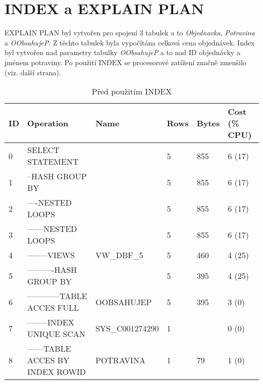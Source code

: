 \documentclass[11pt, a4paper]{article}[]
\begin{document}
    \section{INDEX a EXPLAIN PLAN}
    EXPLAIN PLAN byl vytvořen pro spojení 3 tabulek a to \textit{Objednavka}, \textit{Potravina}
    a \textit{OObsahujeP}. Z těchto tabulek byla vypočítána celková cena objednávek.
    Index byl vytvořen nad parametry tabulky \textit{OObsahujeP} a to nad ID objednávky
    a jménem potraviny. Po použití INDEX se procesorové zatížení značně zmenšilo
    (viz. další strana).
\pagebreak
    \begin{table}[h]
	\caption{Před použitím INDEX}
	\centering
	\begin{tabular}{|l|l|l|l|l|l|}
        \hline
        ID & Operation                        & Name            & Rows & Bytes & Cost (\% CPU) \\ \hline
        0  & SELECT STATEMENT                 &                 & 5    & 855   & 6 (17)        \\
        1  & --HASH GROUP BY                  &                 & 5    & 855   & 6 (17)        \\
        2  & ----NESTED LOOPS                 &                 & 5    & 855   & 6 (17)        \\
        3  & ------NESTED LOOPS               &                 & 5    & 855   & 6 (17)        \\
        4  & --------VIEWS                    & VW\_DBF\_5      & 5    & 460   & 4 (25)        \\
        5  & ----------HASH GROUP BY          &                 & 5    & 395   & 4 (25)        \\
        6  & ------------TABLE ACCES FULL     & OOBSAHUJEP      & 5    & 395   & 3 (0)         \\
        7  & --------INDEX UNIQUE SCAN        & SYS\_C001274290 & 1    &       & 0 (0)         \\
        8  & ------TABLE ACCES BY INDEX ROWID & POTRAVINA       & 1    & 79    & 1 (0)         \\ \hline
        \end{tabular}
        \end{table}
\end{document}
